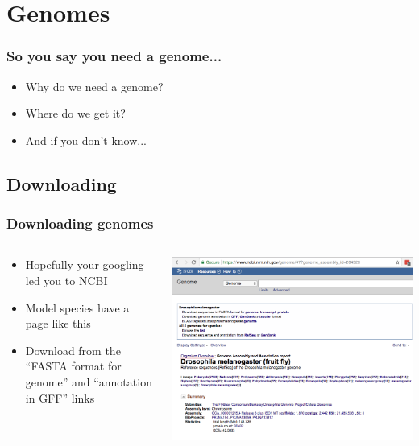\documentclass[14pt,handout]{beamer}
\begin{document}
\section{Genomes}

\begin{frame}
\frametitle{So you say you need a genome...}
\begin{itemize}
	\large
	\item<+-> Why do we need a genome?
	\item<+-> Where do we get it?
	\item<+-> And if you don't know...
\end{itemize}
\end{frame}

\subsection{Downloading}

\begin{frame}
\frametitle{Downloading genomes}
\begin{columns}
	\begin{column}{0.3\textwidth}
		\begin{itemize}
			\footnotesize
			\item<+-> Hopefully your googling led you to NCBI
			\item<+-> Model species have a page like this
			\item<+-> Download from the ``FASTA format for genome'' and ``annotation in GFF'' links
		\end{itemize}
		\end{column}
	\begin{column}{0.7\textwidth}
		\begin{center}
     		\includegraphics[width=1\textwidth]{images_20171012_fly_genome.png}
     	\end{center}
	\end{column}
\end{columns}
\end{frame}
\end{document}
